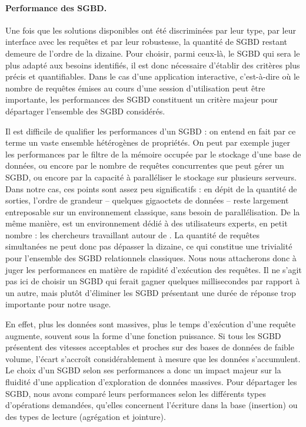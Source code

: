 \paragraph{Performance des SGBD.}

Une fois que les solutions disponibles ont été discriminées par leur type, par leur interface avec les requêtes et par leur robustesse, la quantité de SGBD restant demeure de l'ordre de la dizaine.
Pour choisir, parmi ceux-là, le SGBD qui sera le plus adapté aux besoins identifiés, il est donc nécessaire d'établir des critères plus précis et quantifiables.
Dans le cas d'une application interactive, c'est-à-dire où le nombre de requêtes émises au cours d'une session d'utilisation peut être importante, les performances des SGBD constituent un critère majeur pour départager l'ensemble des SGBD considérés.

Il est difficile de qualifier les \og performances\fg{} d'un SGBD : on entend en fait par ce terme un vaste ensemble hétérogènes de propriétés.
On peut par exemple juger les performances par le filtre de la mémoire occupée par le stockage d'une base de données, ou encore par le nombre de requêtes concurrentes que peut gérer un SGBD, ou encore par la capacité à paralléliser le stockage sur plusieurs serveurs.
Dans notre cas, ces points sont assez peu significatifs : en dépit de la quantité de sorties, l'ordre de grandeur -- quelques gigaoctets de données -- reste largement entreposable sur un environnement classique, sans besoin de parallélisation.
De la même manière, \simedb{} est un environnement dédié à des utilisateurs experts, en petit nombre : les chercheurs travaillant autour de \simfeodal{}.
La quantité de requêtes simultanées ne peut donc pas dépasser la dizaine, ce qui constitue une trivialité pour l'ensemble des SGBD relationnels classiques.
Nous nous attacherons donc à juger les performances en matière de rapidité d'exécution des requêtes.
Il ne s'agit pas ici de choisir un SGBD qui ferait gagner quelques millisecondes par rapport à un autre, mais plutôt d'éliminer les SGBD présentant une durée de réponse trop importante pour notre usage.

En effet, plus les données sont massives, plus le temps d'exécution d'une requête augmente, souvent sous la forme d'une fonction puissance.
Si tous les SGBD présentent des vitesses acceptables et proches sur des bases de données de faible volume, l'écart s'accroît considérablement à mesure que les données s'accumulent.
Le choix d'un SGBD selon ses performances a donc un impact majeur sur la fluidité d'une application d'exploration de données massives.
Pour départager les SGBD, nous avons comparé leurs performances selon les différents types d'opérations demandées, qu'elles concernent l'écriture dans la base (insertion) ou des types de lecture (agrégation et jointure).


